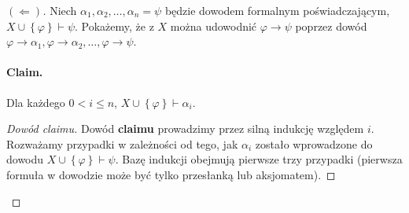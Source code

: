 \begin{proof}[\( (\Leftarrow) \)]
    Niech \( \alpha_1, \alpha_2, \ldots, \alpha_n = \psi \) będzie dowodem formalnym poświadczającym, \( X \cup \left\{ \varphi \right\} \vdash \psi \). Pokażemy, że z \( X \) można udowodnić \( \varphi \to \psi \) poprzez dowód \( \varphi \to \alpha_1, \varphi \to \alpha_2, \ldots, \varphi \to \psi \).

    \paragraph{Claim.} Dla każdego \( 0 < i \leqslant n \), \( X \cup \left\{ \varphi \right\} \vdash \alpha_i \).

\begin{proof}[Dowód claimu]
    Dowód \textbf{claimu} prowadzimy przez silną indukcję względem \( i \). Rozważamy przypadki w zależności od tego, jak \( \alpha_i \) zostało wprowadzone do dowodu \( X \cup \left\{ \varphi \right\} \vdash \psi\). Bazę indukcji obejmują pierwsze trzy przypadki (pierwsza formuła w dowodzie może być tylko przesłanką lub aksjomatem).


\end{proof}
\end{proof}
